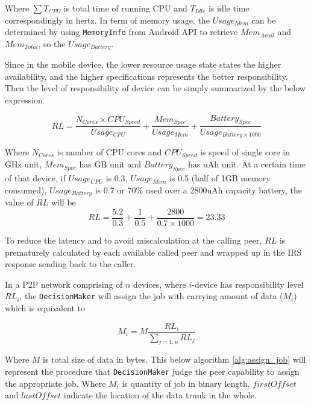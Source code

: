 \documentclass[conference]{IEEEtran}
\begin{document}
Where $\sum{T_{CPU}}$ is total time of running CPU and $T_{Idle}$ is idle time correspondingly in hertz. In term of memory usage, the $Usage_{Mem}$ can be determined by using \texttt{MemoryInfo} from Android API to retrieve $Mem_{Avail}$ and $Mem_{Total}$, so the $Usage_{Battery}$.

Since in the mobile device, the lower resource usage state states the higher availability, and the higher specifications represents the better responsibility. Then the level of responsibility of device can be simply summarized by the below expression

\begin{equation}
\label{eq:res_level}
RL = \frac{N_{Cores} \times CPU_{Speed}}{Usage_{CPU}} + \frac{Mem_{Spec}}{Usage_{Mem}} + \frac{Battery_{Spec}}{Usage_{Battery \times 1000}}
\end{equation}

Where $N_{Cores}$ is number of CPU cores and $CPU_{Speed}$ is speed of single core in GHz unit, $Mem_{Spec}$ has GB unit and $Battery_{Spec}$ has uAh unit. At a certain time of that device, if $Usage_{CPU}$ is 0.3, $Usage_{Mem}$ is 0.5 (half of 1GB memory consumed), $Usage_{Battery}$ is 0.7 or 70\% used over a 2800uAh capacity battery, the value of $RL$ will be
$$RL = \frac{5.2}{0.3} + \frac{1}{0.5} + \frac{2800}{0.7 \times 1000} = 23.33$$

To reduce the latency and to avoid miscalculation at the calling peer, $RL$ is prematurely calculated by each available called peer and wrapped up in the IRS response sending back to the caller. 

In a P2P network comprising of $n$ devices, where $i$-device has responsibility level $RL_{i}$, the \texttt{DecisionMaker} will assign the job with carrying amount of data ($M_{i}$) which is equivalent to

\begin{equation} 
\label{eq:data_amount}
M_{i} = M\frac{RL_{i}}{\sum_{j = \overline{1,n}}{RL_{j}}}
\end{equation}

Where $M$ is total size of data in bytes. This below algorithm \ref{alg:assign_job} will represent the procedure that \texttt{DecisionMaker} judge the peer capability to assign the appropriate job. Where $M_{i}$ is quantity of job in binary length, $firstOffset$ and $lastOffset$ indicate the location of the data trunk in the whole.
\end{document}
